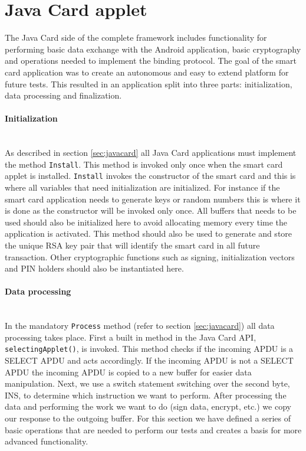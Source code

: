 \section{Java Card applet}
The Java Card side of the complete framework includes functionality for performing basic data exchange with the Android application, basic cryptography and operations needed to implement the binding protocol. The goal of the smart card application was to create an autonomous and easy to extend platform for future tests. This resulted in an application split into three parts: initialization, data processing and finalization.

\paragraph{Initialization}\mbox{}\\
As described in section \ref{sec:javacard} all Java Card applications must implement the method \texttt{Install}. This method is invoked only once when the smart card applet is installed. \texttt{Install} invokes the constructor of the smart card and this is where all variables that need initialization are initialized. For instance if the smart card application needs to generate keys or random numbers this is where it is done as the constructor will be invoked only once. All buffers that needs to be used should also be initialized here to avoid allocating memory every time the application is activated. This method should also be used to generate and store the unique RSA key pair that will identify the smart card in all future transaction. Other cryptographic functions such as signing, initialization vectors and PIN holders should also be instantiated here.

\paragraph{Data processing}\mbox{}\\
In the mandatory \texttt{Process} method (refer to section \ref{sec:javacard}) all data processing takes place. First a built in method in the Java Card API, \texttt{selectingApplet()}, is invoked. This method checks if the incoming APDU is a SELECT APDU and acts accordingly. If the incoming APDU is not a SELECT APDU the incoming APDU is copied to a new buffer for easier data manipulation. Next, we use a switch statement switching over the second byte, INS, to determine which instruction we want to perform. After processing the data and performing the work we want to do (sign data, encrypt, etc.) we copy our response to the outgoing buffer. For this section we have defined a series of basic operations that are needed to perform our tests and creates a basis for more advanced functionality.

